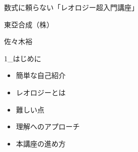 \begin{frame}

\end{frame}

\begin{frame}{数式に頼らない「レオロジー超入門講座」}

\begin{block}{東亞合成（株）}

\end{block}

\begin{block}{佐々木裕}

\end{block}

\end{frame}

\begin{frame}{1\_はじめに}

\begin{itemize}

\item
  簡単な自己紹介
\item
  レオロジーとは
\item
  難しい点
\item
  理解へのアプローチ
\item
  本講座の進め方
\end{itemize}

\end{frame}

